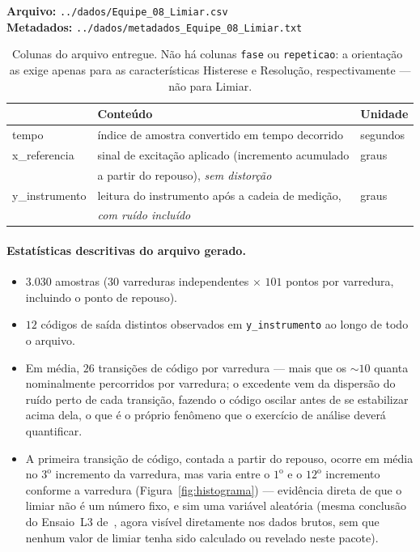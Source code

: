 \textbf{Arquivo:} \texttt{../dados/Equipe\_08\_Limiar.csv}\\
\textbf{Metadados:} \texttt{../dados/metadados\_Equipe\_08\_Limiar.txt}

\begin{table}[H]
\centering\small
\caption{Colunas do arquivo entregue. Não há colunas \texttt{fase} ou \texttt{repeticao}: a
orientação~\cite{orientacao2026} as exige apenas para as características Histerese e Resolução,
respectivamente --- não para Limiar.}
\label{tab:colunas}
\begin{tabular}{@{}>{\ttfamily}lll@{}}
\toprule
\multicolumn{1}{l}{\textbf{Coluna}} & \textbf{Conteúdo} & \textbf{Unidade}\\
\midrule
tempo & índice de amostra convertido em tempo decorrido & segundos\\
x\_referencia & sinal de excitação aplicado (incremento acumulado & graus\\
              & a partir do repouso), \emph{sem distorção} & \\
y\_instrumento & leitura do instrumento após a cadeia de medição, & graus\\
               & \emph{com ruído incluído} & \\
\bottomrule
\end{tabular}
\end{table}

\paragraph{Estatísticas descritivas do arquivo gerado.}
\begin{itemize}[leftmargin=1.4em]
\item $3.030$ amostras ($30$ varreduras independentes $\times$ $101$ pontos por varredura,
      incluindo o ponto de repouso).
\item $12$ códigos de saída distintos observados em \texttt{y\_instrumento} ao longo de todo o
      arquivo.
\item Em média, $26$ transições de código por varredura --- mais que os $\sim10$ quanta
      nominalmente percorridos por varredura; o excedente vem da dispersão do ruído perto de
      cada transição, fazendo o código oscilar antes de se estabilizar acima dela, o que é o
      próprio fenômeno que o exercício de análise deverá quantificar.
\item A primeira transição de código, contada a partir do repouso, ocorre em média no
      $3^\text{o}$ incremento da varredura, mas varia entre o $1^\text{o}$ e o $12^\text{o}$
      incremento conforme a varredura (Figura~\ref{fig:histograma}) --- evidência direta de que
      o limiar não é um número fixo, e sim uma variável aleatória (mesma conclusão do
      Ensaio~L3 de~\cite{limiarv1}, agora visível diretamente nos dados brutos, sem que nenhum
      valor de limiar tenha sido calculado ou revelado neste pacote).
\end{itemize}

